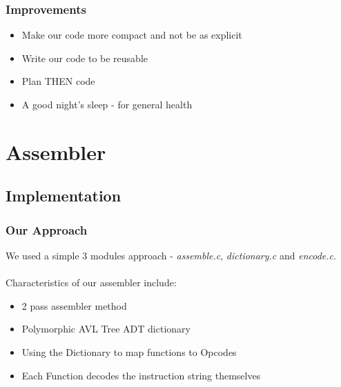 \documentclass{beamer}
\begin{document}

\begin{frame}
\frametitle{Improvements}
\begin{itemize}
\item Make our code more compact and not be as explicit
\item Write our code to be reusable 
\item Plan THEN code
\item A good night's sleep - for general health

\end{itemize}

\end{frame}


\section{Assembler}


\subsection{Implementation}

\begin{frame}
\frametitle{Our Approach}

We used a simple 3 modules approach - \textit{assemble.c}, \textit{dictionary.c} and \textit{encode.c}. 
\\~\\

Characteristics of our assembler include: 
\begin{itemize}
\item 2 pass assembler method

\item Polymorphic AVL Tree ADT dictionary

\item Using the Dictionary to map functions to Opcodes

\item Each Function decodes the instruction string themselves

\end{itemize}

\end{frame}

\end{document}
